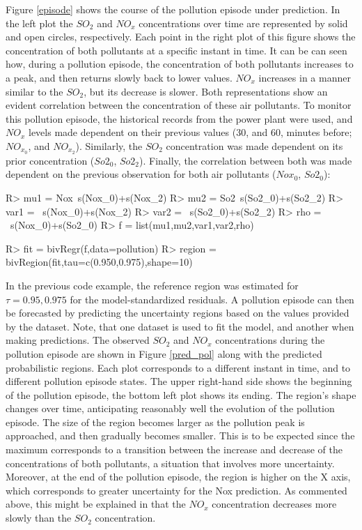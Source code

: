 Figure \ref{episode} shows the course of the pollution episode under prediction. In the left plot the $SO_2$ and $NO_x$ concentrations over time are represented by solid and open circles, respectively. Each point in the right plot of this figure shows the concentration of both pollutants at a specific instant in time. It can be can seen how, during a pollution episode, the concentration of both pollutants increases to a peak, and then returns slowly back to lower values. $NO_x$ increases in a manner similar to the $SO_2$, but its decrease is slower. Both representations show an evident correlation between the concentration of these air pollutants. To monitor this pollution episode, the historical records from the power plant were used, and $NO_x$ levels made dependent on their previous values (30, and 60, minutes before; $NO_{x_0}$, and $NO_{x_2}$). Similarly, the $SO_2$ concentration was made dependent on its prior concentration ($So2_0$, $So2_2$). Finally, the correlation between both was made dependent on the previous observation for both air pollutants ($Nox_0$, $So2_0$):


\begin{example}
R> mu1 = Nox~s(Nox_0)+s(Nox_2)
R> mu2 = So2~s(So2_0)+s(So2_2)
R> var1 = ~s(Nox_0)+s(Nox_2)
R> var2 = ~s(So2_0)+s(So2_2)
R> rho = ~s(Nox_0)+s(So2_0)
R> f = list(mu1,mu2,var1,var2,rho)

R> fit = bivRegr(f,data=pollution)
R> region = bivRegion(fit,tau=c(0.950,0.975),shape=10)
\end{example}

In the previous code example, the reference region was estimated for $\tau=0.95, 0.975$ for the model-standardized residuals. A pollution episode can then be forecasted by predicting the uncertainty regions based on the values provided by the  dataset. Note, that one dataset is used to fit the model, and another when making predictions. The observed $SO_2$ and $NO_x$ concentrations during the pollution episode are shown in Figure \ref{pred_pol} along with the predicted probabilistic regions. Each plot corresponds to a different instant in time, and to different pollution episode states. The upper right-hand side shows the beginning of the pollution episode, the bottom left plot shows its ending. The region's shape changes over time, anticipating reasonably well the evolution of the pollution episode. The size of the region becomes larger as the pollution peak is approached, and then gradually becomes smaller. This is to be expected since the maximum corresponds to a transition between the increase and decrease of the concentrations of both pollutants, a situation that involves more uncertainty. Moreover, at the end of the pollution episode, the region is higher on the X axis, which corresponds to greater uncertainty for the Nox prediction. As commented above, this might be explained in that the $NO_x$ concentration decreases more slowly than the $SO_2$ concentration.


